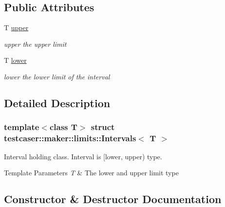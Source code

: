 \subsection*{Public Attributes}
\begin{DoxyCompactItemize}
\item 
\mbox{\label{structtestcaser_1_1maker_1_1limits_1_1Intervals_ae8f8bf8607c83b429729bd36e74699dd}} 
T \hyperlink{structtestcaser_1_1maker_1_1limits_1_1Intervals_ae8f8bf8607c83b429729bd36e74699dd}{upper}
\begin{DoxyCompactList}\small\item\em upper the upper limit \end{DoxyCompactList}\item 
\mbox{\label{structtestcaser_1_1maker_1_1limits_1_1Intervals_a51f277024599c24b6bfdffe1276f236d}} 
T \hyperlink{structtestcaser_1_1maker_1_1limits_1_1Intervals_a51f277024599c24b6bfdffe1276f236d}{lower}
\begin{DoxyCompactList}\small\item\em lower the lower limit of the interval \end{DoxyCompactList}\end{DoxyCompactItemize}


\subsection{Detailed Description}
\subsubsection*{template$<$class T$>$\newline
struct testcaser\+::maker\+::limits\+::\+Intervals$<$ T $>$}

Interval holding class. Interval is \mbox{[}lower, upper) type. 


\begin{DoxyTemplParams}{Template Parameters}
{\em T} & The lower and upper limit type \\
\hline
\end{DoxyTemplParams}


\subsection{Constructor \& Destructor Documentation}
\mbox{\label{structtestcaser_1_1maker_1_1limits_1_1Intervals_a69fe886908002aa20f41ed886fc213ef}} 
